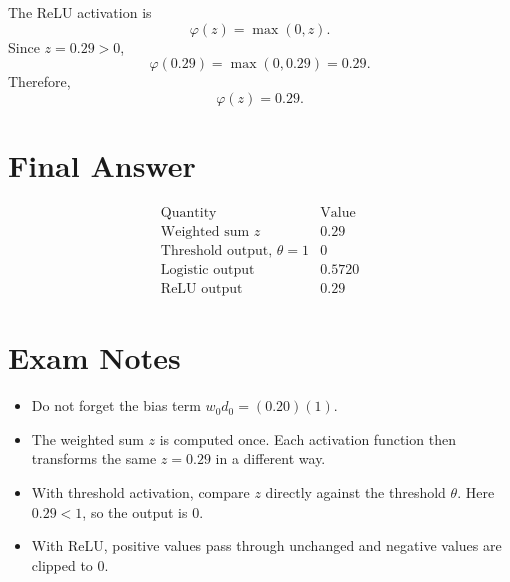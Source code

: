 \documentclass[11pt]{article}
\begin{document}
The ReLU activation is
\[
    \varphi(z)=\max(0,z).
\]
Since \(z=0.29>0\),
\[
    \varphi(0.29)=\max(0,0.29)=0.29.
\]
Therefore,
\[
    \boxed{\varphi(z)=0.29}.
\]

\section*{Final Answer}

\[
\boxed{
\begin{array}{c|c}
\text{Quantity} & \text{Value} \\
\hline
\text{Weighted sum } z & 0.29 \\
\text{Threshold output, } \theta=1 & 0 \\
\text{Logistic output} & 0.5720 \\
\text{ReLU output} & 0.29
\end{array}
}
\]

\section*{Exam Notes}

\begin{itemize}
    \item Do not forget the bias term \(w_0d_0=(0.20)(1)\).
    \item The weighted sum \(z\) is computed once. Each activation function then
    transforms the same \(z=0.29\) in a different way.
    \item With threshold activation, compare \(z\) directly against the threshold
    \(\theta\). Here \(0.29<1\), so the output is \(0\).
    \item With ReLU, positive values pass through unchanged and negative values
    are clipped to \(0\).
\end{itemize}
\end{document}

